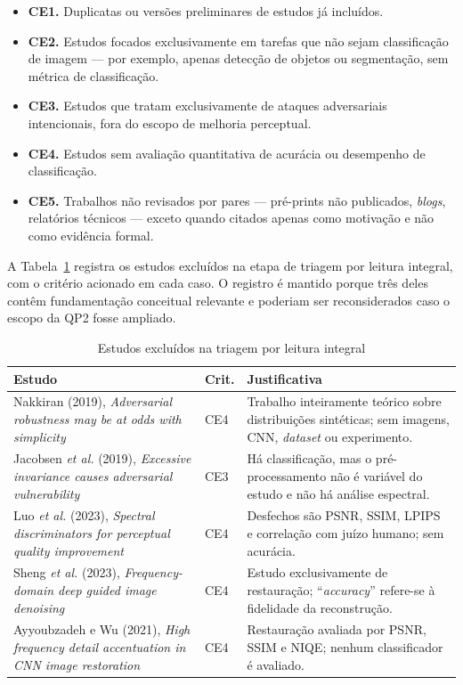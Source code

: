 \documentclass[conference]{IEEEtran}
\begin{document}
\begin{itemize}
\item \textbf{CE1.} Duplicatas ou versões preliminares de estudos já incluídos.
\item \textbf{CE2.} Estudos focados exclusivamente em tarefas que não sejam
classificação de imagem --- por exemplo, apenas detecção de objetos ou
segmentação, sem métrica de classificação.
\item \textbf{CE3.} Estudos que tratam exclusivamente de ataques adversariais
intencionais, fora do escopo de melhoria perceptual.
\item \textbf{CE4.} Estudos sem avaliação quantitativa de acurácia ou
desempenho de classificação.
\item \textbf{CE5.} Trabalhos não revisados por pares --- pré-prints não
publicados, \textit{blogs}, relatórios técnicos --- exceto quando citados
apenas como motivação e não como evidência formal.
\end{itemize}

A Tabela~\ref{tab:excluidos} registra os estudos excluídos na etapa de triagem
por leitura integral, com o critério acionado em cada caso. O registro é
mantido porque três deles contêm fundamentação conceitual relevante e poderiam
ser reconsiderados caso o escopo da QP2 fosse ampliado.

\begin{table}[htbp]
\caption{Estudos excluídos na triagem por leitura integral}
\begin{center}
\footnotesize
\begin{tabular}{|p{3.3cm}|p{0.7cm}|p{2.9cm}|}
\hline
\textbf{Estudo} & \textbf{Crit.} & \textbf{Justificativa} \\
\hline
Nakkiran (2019), \textit{Adversarial robustness may be at odds with
simplicity} & CE4 & Trabalho inteiramente teórico sobre distribuições
sintéticas; sem imagens, CNN, \textit{dataset} ou experimento. \\
\hline
Jacobsen \textit{et al.} (2019), \textit{Excessive invariance causes
adversarial vulnerability} & CE3 & Há classificação, mas o pré-processamento
não é variável do estudo e não há análise espectral. \\
\hline
Luo \textit{et al.} (2023), \textit{Spectral discriminators for perceptual
quality improvement} & CE4 & Desfechos são PSNR, SSIM, LPIPS e correlação com
juízo humano; sem acurácia. \\
\hline
Sheng \textit{et al.} (2023), \textit{Frequency-domain deep guided image
denoising} & CE4 & Estudo exclusivamente de restauração; ``\textit{accuracy}''
refere-se à fidelidade da reconstrução. \\
\hline
Ayyoubzadeh e Wu (2021), \textit{High frequency detail accentuation in CNN
image restoration} & CE4 & Restauração avaliada por PSNR, SSIM e NIQE; nenhum
classificador é avaliado. \\
\hline
\end{tabular}
\label{tab:excluidos}
\end{center}
\end{table}
\end{document}

